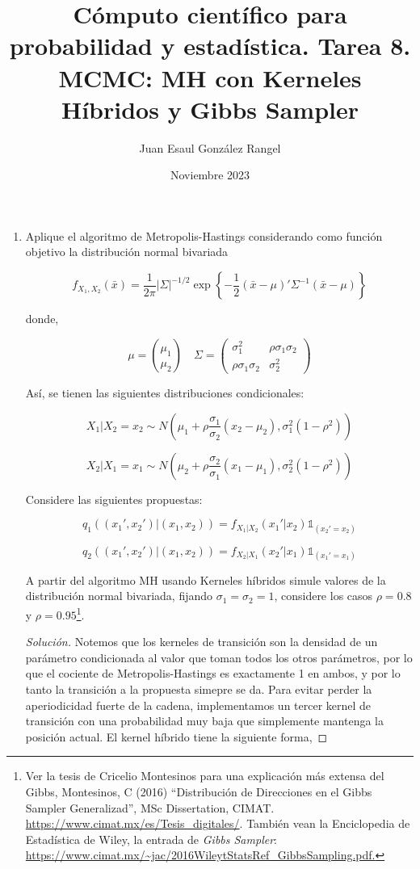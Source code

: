 \documentclass{article}
\title{Cómputo científico para probabilidad y estadística. Tarea 8.\\
MCMC: MH con Kerneles Híbridos y Gibbs
Sampler}
\author{Juan Esaul González Rangel}
\date{Noviembre 2023}
\begin{document}
\maketitle


\begin{enumerate}

    \item Aplique el algoritmo de Metropolis-Hastings considerando como función 
    objetivo la distribución normal bivariada

    \[ f_{X_1,X_2}(\bar x) = \frac1{2\pi} |\Sigma|^{-1/2} \exp\left\{ -\frac12 
    (\bar x - \mu)'\Sigma^{-1}(\bar x - \mu) \right\} \]

    donde, 

    \[ \mu = \binom{\mu_1}{\mu_2} \quad \Sigma = \begin{pmatrix}
        \sigma_1^2 & \rho \sigma_1\sigma_2 \\
        \rho\sigma_1\sigma_2 & \sigma_2^2
    \end{pmatrix} \]
    
    Así, se tienen las siguientes distribuciones condicionales:
    
    \[ X_1 | X_2 = x_2 \sim N\left( \mu_1 + \rho \frac{\sigma_1}{\sigma_2}(x_2 - 
    \mu_2), \sigma_1^2(1 - \rho^2) \right) \]

    \[ X_2 | X_1 = x_1 \sim N\left( \mu_2 + \rho \frac{\sigma_2}{\sigma_1}(x_1 - 
    \mu_1), \sigma_2^2(1-\rho^2) \right) \]
    
    Considere las siguientes propuestas:

    \[ q_1 ((x_1',x_2') | (x_1,x_2)) = f_{X_1|X_2}(x_1'|x_2)\mathds 1_{(x_2' = x_2)}  \]

    \[ q_2 ((x_1',x_2') | (x_1,x_2)) = f_{X_2|X_1}(x_2'|x_1)\mathds 1_{(x_1' = x_1)}  \]

    
    A partir del algoritmo MH usando Kerneles híbridos simule valores de la distribución 
    normal bivariada, fijando $\sigma_1 = \sigma_2 = 1$, considere los casos 
    $\rho = 0.8$ y $\rho = 0.95$\footnote{Ver la tesis de Cricelio Montesinos para 
    una explicación más extensa del Gibbs, Montesinos, C (2016) ``Distribución de 
    Direcciones en el Gibbs Sampler Generalizad'', MSc Dissertation, CIMAT. 
    \url{https://www.cimat.mx/es/Tesis_digitales/}. También vean la Enciclopedia 
    de Estadística de Wiley, la entrada de \textit{Gibbs Sampler}: 
    \url{https://www.cimat.mx/~jac/2016WileytStatsRef_GibbsSampling.pdf.}}.


    \begin{proof}[Solución] Notemos que los kerneles de transición son la densidad de un 
        parámetro condicionada al valor que toman todos los otros parámetros, por lo que 
        el cociente de Metropolis-Hastings es exactamente 1 en ambos, y por lo tanto la 
        transición a la propuesta simepre se da.  Para evitar perder la aperiodicidad
        fuerte de la cadena, implementamos un tercer kernel de transición con una probabilidad
        muy baja que simplemente mantenga la posición actual. El kernel
        híbrido tiene la siguiente forma,


\end{proof}
\end{enumerate}
\end{document}
